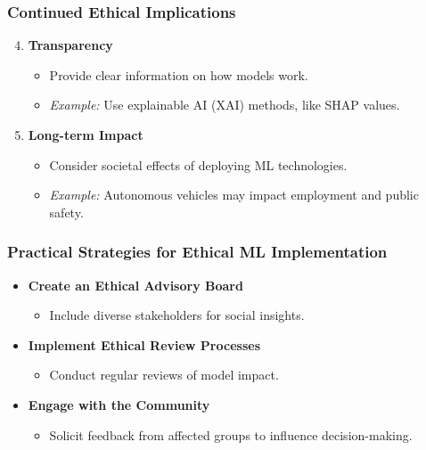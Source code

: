 \documentclass[aspectratio=169]{beamer}
\begin{document}
\begin{frame}[fragile]
    \frametitle{Continued Ethical Implications}
    \begin{enumerate}\setcounter{enumi}{3}
        \item \textbf{Transparency}
        \begin{itemize}
            \item Provide clear information on how models work.
            \item \emph{Example:} Use explainable AI (XAI) methods, like SHAP values.
        \end{itemize}

        \item \textbf{Long-term Impact}
        \begin{itemize}
            \item Consider societal effects of deploying ML technologies.
            \item \emph{Example:} Autonomous vehicles may impact employment and public safety.
        \end{itemize}
    \end{enumerate}
\end{frame}

\begin{frame}[fragile]
    \frametitle{Practical Strategies for Ethical ML Implementation}
    \begin{itemize}
        \item \textbf{Create an Ethical Advisory Board}
        \begin{itemize}
            \item Include diverse stakeholders for social insights.
        \end{itemize}
        
        \item \textbf{Implement Ethical Review Processes}
        \begin{itemize}
            \item Conduct regular reviews of model impact.
        \end{itemize}
        
        \item \textbf{Engage with the Community}
        \begin{itemize}
            \item Solicit feedback from affected groups to influence decision-making.
        \end{itemize}
    \end{itemize}
\end{frame}
\end{document}
